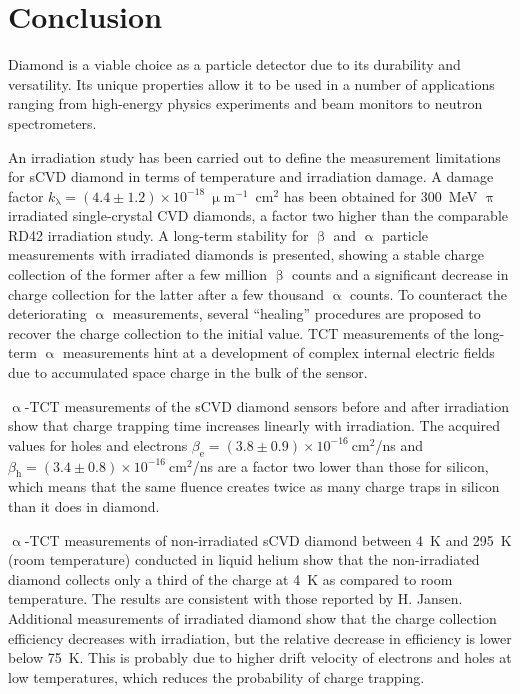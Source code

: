 \chapter*{Conclusion}
Diamond is a viable choice as a particle detector due to its durability and versatility. Its unique properties allow it to be used in a number of applications ranging from high-energy physics experiments and beam monitors to neutron spectrometers. 

An irradiation study has been carried out to define the measurement limitations for sCVD diamond in terms of temperature and irradiation damage. A damage factor $k_{\mathrm{\lambda}}=(4.4\pm1.2)\times10^{-18}~\upmu$m$^{-1}$~cm$^{2}$ has been obtained for 300~MeV $\uppi$ irradiated single-crystal CVD diamonds, a factor two higher than the comparable RD42 irradiation study. A long-term stability for $\upbeta$ and $\upalpha$ particle measurements with irradiated diamonds is presented, showing a stable charge collection of the former after a few million $\upbeta$ counts and a significant decrease in charge collection for the latter after a few thousand $\upalpha$ counts. To counteract the deteriorating $\upalpha$ measurements, several ``healing'' procedures are proposed to recover the charge collection to the initial value. TCT measurements of the long-term $\upalpha$ measurements hint at a development of complex internal electric fields due to accumulated space charge in the bulk of the sensor.

$\upalpha$-TCT measurements of the sCVD diamond sensors before and after irradiation show that charge trapping time increases linearly with irradiation. The acquired values for holes and electrons $\beta_\mathrm{e}=(3.8\pm0.9)\times10^{-16}~$cm$^2$/ns and $\beta_\mathrm{h}=(3.4\pm0.8)\times10^{-16}~$cm$^2$/ns are a factor two lower than those for silicon, which means that the same fluence creates twice as many charge traps in silicon than it does in diamond.

$\upalpha$-TCT measurements of non-irradiated sCVD diamond between 4~K and 295~K (room temperature) conducted in liquid helium show that the non-irradiated diamond collects only a third of the charge at 4~K as compared to room temperature. The results are consistent with those reported by H. Jansen. Additional measurements of irradiated diamond show that the charge collection efficiency decreases with irradiation, but the relative decrease in efficiency is lower below 75~K. This is probably due to higher drift velocity of electrons and holes at low temperatures, which reduces the probability of charge trapping.

